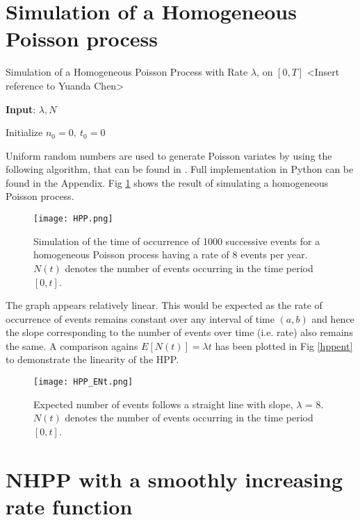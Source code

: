 \documentclass[%
 reprint,
 amsmath,amssymb,
 aps,
]{revtex4-2}
\theoremstyle{definition}
\begin{document}
\section{\label{q:3}Simulation of a Homogeneous Poisson process}

\begin{algorithm}
\label{alg:2}
\caption{Simulation of a Homogeneous Poisson Process with Rate $\lambda$, on $[0, T]$ <Insert reference to Yuanda Chen>}
\textbf{Input}: $\lambda,N$

Initialize $n_0 = 0 ,\  t_0 = 0$\;
\end{algorithm}

Uniform random numbers are used to generate Poisson variates by using the following algorithm, that can be found in \cite{chen}. Full implementation in Python can be found in the Appendix. Fig \ref{fig:hpp} shows the result of simulating a homogeneous Poisson process.

\begin{figure}[H]
\centering
\texttt{[image: HPP.png]}
\caption{\label{fig:hpp}Simulation of the time of occurrence of 1000 successive events for a homogeneous Poisson process having a rate of 8 events per year. $N(t)$ denotes the number of events occurring in the time period $[0,t]$.}
\end{figure}

The graph appears relatively linear. This would be expected as the rate of occurrence of events remains constant over any interval of time $(a,b)$ and hence the slope corresponding to the number of events over time (i.e. rate) also remains the same. A comparison agains $E[N(t)] = \lambda t$ has been plotted in Fig \ref{hppent} to demonstrate the linearity of the HPP.

\begin{figure}[H]
\centering
\texttt{[image: HPP\_ENt.png]}
\caption{\label{fig:hppent}Expected number of events follows a straight line with slope, $\lambda$ = 8. $N(t)$ denotes the number of events occurring in the time period $[0,t]$.}
\end{figure}

\section{\label{q:4}NHPP with a smoothly increasing rate function}
\end{document}
